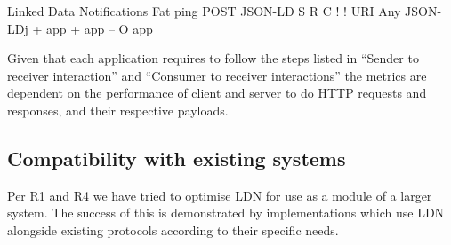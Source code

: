 \documentclass[a4paper]{llncs}
\begin{document}
                                            
                                                Linked Data Notifications
                                                Fat ping
                                                POST
                                                JSON-LD
                                                S R C
                                                !
                                                ! URI
                                                Any
                                                JSON-LDj
                                                + app
                                                + app
                                                –
                                                O app
                                            
                                        
                                    

                                    
\par Given that each application requires to follow the steps listed in ``\empty Sender to receiver interaction'' and ``\empty Consumer to receiver interactions'' the metrics are dependent on the performance of client and server to do HTTP requests and responses, and their respective payloads.
                                
                            

                            
                                \subsection{Compatibility with existing systems}
  \label{compatibility-with-existing-systems}

                                
                                    
\par Per \empty R1 and \empty R4 we have tried to optimise LDN for use as a module of a larger system. The success of this is demonstrated by implementations which use LDN alongside existing protocols according to their specific needs.
\end{document}
